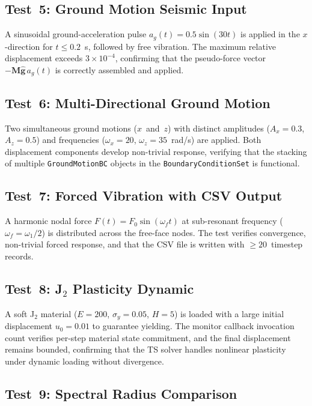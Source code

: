 \subsection{Test~5: Ground Motion Seismic Input}
\label{sec:phase5-t5}

A sinusoidal ground-acceleration pulse
$a_g(t) = 0.5\sin(30t)$ is applied in the $x$-direction for
$t \le 0.2$~s, followed by free vibration.  The maximum relative
displacement exceeds $3\times 10^{-4}$, confirming that the
pseudo-force vector $-\mathbf{M}\hat{\mathbf{g}}\,a_g(t)$ is
correctly assembled and applied.


\subsection{Test~6: Multi-Directional Ground Motion}
\label{sec:phase5-t6}

Two simultaneous ground motions ($x$~and~$z$) with distinct
amplitudes ($A_x=0.3$, $A_z=0.5$) and frequencies
($\omega_x=20$, $\omega_z=35$~rad/s) are applied.  Both
displacement components develop non-trivial response, verifying
that the stacking of multiple \texttt{GroundMotionBC} objects
in the \texttt{BoundaryConditionSet} is functional.


\subsection{Test~7: Forced Vibration with CSV Output}
\label{sec:phase5-t7}

A harmonic nodal force $F(t) = F_0 \sin(\omega_f t)$ at
sub-resonant frequency ($\omega_f = \omega_1/2$) is distributed
across the free-face nodes.  The test verifies convergence,
non-trivial forced response, and that the CSV file is written
with $\ge 20$~timestep records.


\subsection{Test~8: J$_2$ Plasticity Dynamic}
\label{sec:phase5-t8}

A soft J$_2$ material ($E=200$, $\sigma_y=0.05$, $H=5$) is loaded
with a large initial displacement $u_0=0.01$ to guarantee yielding.
The monitor callback invocation count verifies per-step material
state commitment, and the final displacement remains bounded,
confirming that the TS solver handles nonlinear plasticity under
dynamic loading without divergence.


\subsection{Test~9: Spectral Radius Comparison}
\label{sec:phase5-t9}


